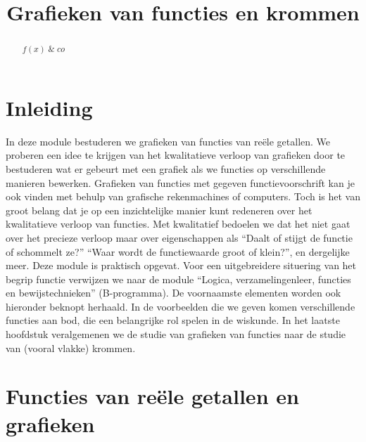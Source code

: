 \documentclass{ximera}
\title{Grafieken van functies en krommen}
\begin{document}
\begin{abstract}
       $f(x)  \;\&\; co$ 
\end{abstract}
    
\setcounter{module}{9}

\maketitle 

\parindent 0mm

\section*{Inleiding}%

In deze module bestuderen we grafieken van functies van re\"ele
getallen. We proberen een idee te krijgen van het kwalitatieve verloop
van grafieken door te bestuderen wat er gebeurt met een grafiek als we
functies op verschillende manieren bewerken. Grafieken van functies
met gegeven functievoorschrift kan je ook vinden met behulp van
grafische rekenmachines of computers. Toch is het van groot belang dat
je op een inzichtelijke manier kunt redeneren over het kwalitatieve
verloop van functies. Met kwalitatief bedoelen we dat het niet gaat
over het precieze verloop maar over eigenschappen als ``Daalt of
stijgt de functie of schommelt ze?'' ``Waar wordt de functiewaarde
groot of klein?'', en dergelijke meer. Deze module is praktisch
opgevat. Voor een uitgebreidere situering van het begrip functie
verwijzen we naar de module ``Logica, verzamelingenleer, functies en
bewijstechnieken'' (B-programma). De voornaamste elementen worden
ook hieronder beknopt herhaald. In de voorbeelden die we geven
komen verschillende functies aan bod, die een belangrijke rol spelen
in de wiskunde.  In het laatste hoofdstuk veralgemenen we de studie
van grafieken van functies naar de studie van (vooral vlakke) krommen.

\section{Functies van re\"ele getallen en grafieken}
\end{document}
